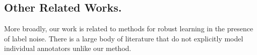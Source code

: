     


\subsection{Other Related Works.}
More broadly, our work is related to methods for robust learning in the presence of label noise. There is a large body of literature that do not explicitly model individual annotators unlike our method. 

